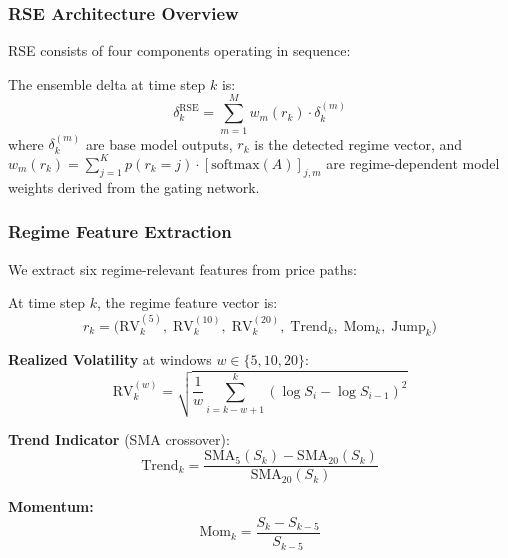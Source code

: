 \subsubsection{RSE Architecture Overview}

RSE consists of four components operating in sequence:

\begin{definition}
The ensemble delta at time step $k$ is:
\begin{equation}
    \delta_k^{\mathrm{RSE}} = \sum_{m=1}^{M} w_m(r_k) \cdot \delta_k^{(m)}
    \label{eq:rse}
\end{equation}
where $\delta_k^{(m)}$ are base model outputs, $r_k$ is the detected regime vector, and $w_m(r_k) = \sum_{j=1}^K p(r_k = j) \cdot [\mathrm{softmax}(A)]_{j,m}$ are regime-dependent model weights derived from the gating network.
\end{definition}

\subsubsection{Regime Feature Extraction}

We extract six regime-relevant features from price paths:

\begin{definition}
At time step $k$, the regime feature vector is:
\begin{equation}
    r_k = \bigl(\mathrm{RV}_k^{(5)},\; \mathrm{RV}_k^{(10)},\; \mathrm{RV}_k^{(20)},\; \mathrm{Trend}_k,\; \mathrm{Mom}_k,\; \mathrm{Jump}_k\bigr)
\end{equation}
\end{definition}

\textbf{Realized Volatility} at windows $w \in \{5, 10, 20\}$:
\begin{equation}
    \mathrm{RV}_k^{(w)} = \sqrt{\frac{1}{w} \sum_{i=k-w+1}^{k} (\log S_i - \log S_{i-1})^2}
\end{equation}

\textbf{Trend Indicator} (SMA crossover):
\begin{equation}
    \mathrm{Trend}_k = \frac{\mathrm{SMA}_5(S_k) - \mathrm{SMA}_{20}(S_k)}{\mathrm{SMA}_{20}(S_k)}
\end{equation}

\textbf{Momentum:}
\begin{equation}
    \mathrm{Mom}_k = \frac{S_k - S_{k-5}}{S_{k-5}}
\end{equation}

